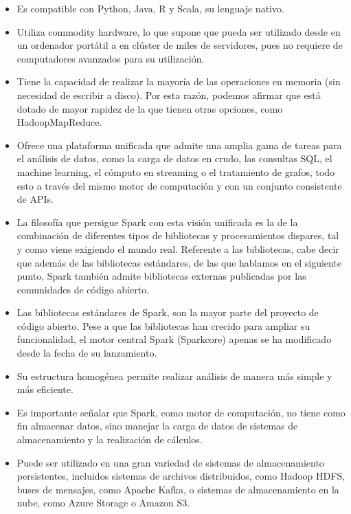 \begin{itemize}
\item Es compatible con Python, Java, R y Scala, su lenguaje nativo.\\

\item Utiliza commodity hardware, lo que supone que pueda ser utilizado desde en un ordenador portátil a en clúster de miles de servidores, pues no requiere de computadores avanzados para su utilización.\\

\item Tiene la capacidad de realizar la mayoría de las operaciones en memoria (sin necesidad de escribir a disco). Por esta razón, podemos afirmar que está dotado de mayor rapidez de la que tienen otras opciones, como HadoopMapReduce.\\

\item Ofrece una plataforma unificada que admite una amplia gama de tareas para el análisis de datos, como la carga de datos en crudo, las consultas SQL, el machine learning, el cómputo en streaming o el tratamiento de grafos, todo esto a través del mismo motor de computación y con un conjunto consistente de APIs. \\

\item La filosofía que persigue Spark con esta visión unificada es la de la combinación de diferentes tipos de bibliotecas y procesamientos dispares, tal y como viene exigiendo el mundo real. Referente a las bibliotecas, cabe decir que además de las bibliotecas estándares, de las que hablamos en el siguiente punto, Spark también admite bibliotecas externas publicadas por las comunidades de código abierto.\\

\item Las bibliotecas estándares de Spark, son la mayor parte del proyecto de código abierto. Pese a que las bibliotecas han crecido para ampliar su funcionalidad, el motor central Spark (Sparkcore) apenas se ha modificado desde la fecha de su lanzamiento.\\

\item Su estructura homogénea permite realizar análisis de manera más simple y más eficiente.\\

\item Es importante señalar que Spark, como motor de computación, no tiene como fin almacenar datos, sino manejar la carga de datos de sistemas de almacenamiento y la realización de cálculos.\\

\item Puede ser utilizado en una gran variedad de sistemas de almacenamiento persistentes, incluidos sistemas de archivos distribuidos, como Hadoop HDFS, buses de mensajes, como Apache Kafka, o sistemas de almacenamiento en la nube, como Azure Storage o Amazon S3.\\

\end{itemize}
